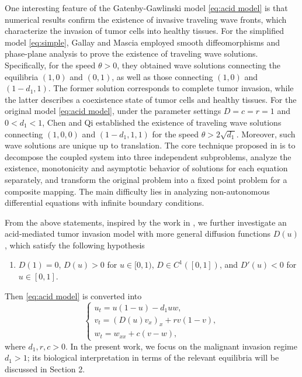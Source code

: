 \documentclass[preprint,sort&compress,final,12pt]{elsarticle}
\numberwithin{equation}{section}
\begin{document}
One interesting feature of the Gatenby-Gawlinski model \eqref{eq:acid model} is that numerical results confirm the existence of invasive traveling wave fronts, which characterize the invasion of tumor cells into healthy tissues. For the simplified model \eqref{eq:simple}, Gallay and Mascia employed smooth diffeomorphisms and phase-plane analysis to prove the existence of traveling wave solutions. Specifically, for the speed $\theta>0$, they obtained wave solutions connecting the equilibria $(1,0)$ and $(0,1)$, as well as those connecting $(1,0)$ and $(1-d_1,1)$. The former solution corresponds to complete tumor invasion, while the latter describes a coexistence state of tumor cells and healthy tissues. For the original model \eqref{eq:acid model}, under the parameter settings $D=c=r=1$ and $0<d_1<1$, Chen and Qi \cite{ChenQi2025} established the existence of traveling wave solutions connecting $(1,0,0)$ and $(1-d_1,1,1)$ for the speed $\theta>2\sqrt{d_1}$. Moreover, such wave solutions are unique up to translation. The core technique proposed in \cite{ChenQi2025} is to decompose the coupled system into three independent subproblems, analyze the existence, monotonicity and asymptotic behavior of solutions for each equation separately, and transform the original problem into a fixed point problem for a composite mapping. The main difficulty lies in analyzing non-autonomous differential equations with infinite boundary conditions. 

From the above statements, inspired by the work in \cite{2024 Lifang ZAMP}, we further investigate an acid-mediated tumor invasion model with more general diffusion functions $D(u)$, which satisfy the following hypothesis
\begin{enumerate}
\item[($H_1$)] {$D(1)=0$, $D(u)>0$ for $u\in[0,1)$, $D\in C^1([0,1])$, and $D'(u)<0$ for $u\in[0,1]$.}
\end{enumerate}
Then \eqref{eq:acid model} is converted into
\begin{equation}\label{eq:main-model}
\begin{cases}
u_t=u(1-u)-d_1uw,\\[0.2cm]
v_t=(D(u)v_x)_x+rv(1-v),\\[0.2cm]
w_t=w_{xx}+c(v-w),
\end{cases}
\end{equation}
where $d_1,r,c>0$. In the present work, we focus on the malignant invasion regime $d_1>1$; its biological interpretation in terms of the relevant equilibria will be discussed in Section 2.
\end{document}
